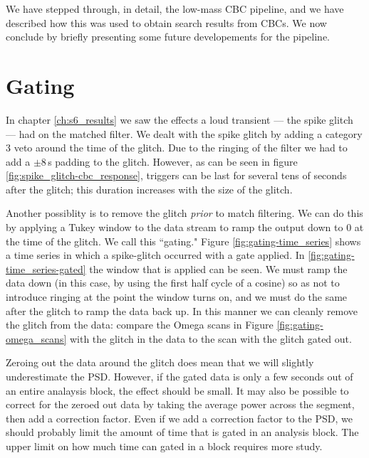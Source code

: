 
We have stepped through, in detail, the low-mass \ac{CBC} pipeline, and we have
described how this was used to obtain search results from \acp{CBC}. We now
conclude by briefly presenting some future developements for the pipeline.

\section{Gating}

In chapter \ref{ch:s6_results} we saw the effects a loud transient --- the
spike glitch --- had on the matched filter. We dealt with the spike glitch by
adding a category 3 veto around the time of the glitch. Due to the ringing of
the filter we had to add a $\pm 8\,$s padding to the glitch. However, as can be
seen in figure \ref{fig:spike_glitch-cbc_response}, triggers can be last for
several tens of seconds after the glitch; this duration increases with the size
of the glitch.

Another possiblity is to remove the glitch \emph{prior} to match filtering. We
can do this by applying a Tukey window to the data stream to ramp the output
down to $0$ at the time of the glitch. We call this ``gating." Figure
\ref{fig:gating-time_series} shows a time series in which a spike-glitch
occurred with a gate applied.  In \ref{fig:gating-time_series-gated} the window
that is applied can be seen. We must ramp the data down (in this case, by using
the first half cycle of a cosine) so as not to introduce ringing at the point
the window turns on, and we must do the same after the glitch to ramp the data
back up. In this manner we can cleanly remove the glitch from the data: compare
the Omega scans in Figure \ref{fig:gating-omega_scans} with the glitch in the
data to the scan with the glitch gated out.

Zeroing out the data around the glitch does mean that we will slightly
underestimate the \ac{PSD}. However, if the gated data is only a few seconds
out of an entire analaysis block, the effect should be small. It may also be
possible to correct for the zeroed out data by taking the average power across
the segment, then add a correction factor. Even if we add a correction factor
to the \ac{PSD}, we should probably limit the amount of time that is gated in
an analysis block. The upper limit on how much time can gated in a block
requires more study.

